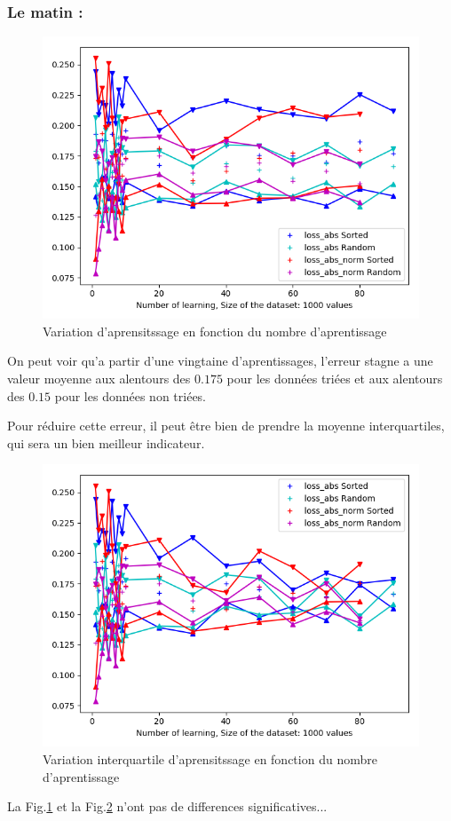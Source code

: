 \subsubsection*{Le matin :}

\begin{figure}[H]
    \center
    \includegraphics[height=\moyen]{sources/data/etfn/graph2.png}
	\caption{Variation d'aprensitssage en fonction du nombre d'aprentissage}
	\label{etfn2}
\end{figure}

On peut voir qu'a partir d'une vingtaine d'aprentissages, l'erreur stagne a une valeur moyenne
aux alentours des $0.175$ pour les données triées et
aux alentours des $0.15$ pour les données non triées.

Pour réduire cette erreur, il peut être bien de prendre la moyenne interquartiles, qui sera un bien meilleur indicateur.

\begin{figure}[H]
    \center
    \includegraphics[height=\moyen]{sources/data/etfn/graph3.png}
	\caption{Variation interquartile d'aprensitssage en fonction du nombre d'aprentissage}
	\label{etfn3}
\end{figure}
\vspace{-5pt}
La Fig.\ref{etfn2} et la Fig.\ref{etfn3} n'ont pas de differences significatives...

